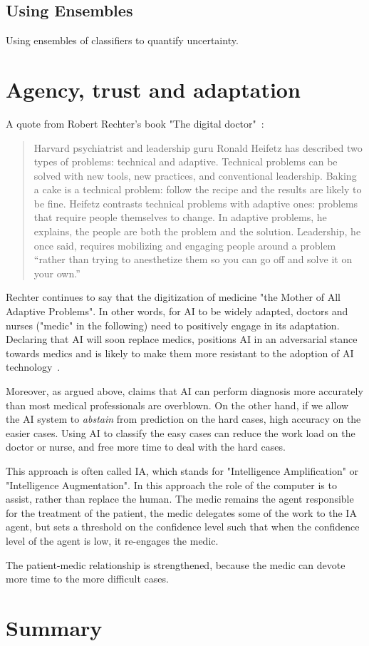 \documentclass[fleqn,10pt]{wlscirep}
\begin{document}
\subsection*{Using Ensembles}

Using ensembles of classifiers to quantify uncertainty.

\section{Agency, trust and adaptation}

A quote from Robert Rechter's book "The digital doctor"~\cite{wachter2015digital}:
\begin{quote}
    Harvard psychiatrist and leadership guru Ronald Heifetz has described two types of problems: technical and adaptive. Technical problems can be solved with new tools, new practices, and conventional leadership. Baking a cake is a technical problem: follow the recipe and the results are likely to be fine. Heifetz contrasts technical problems with adaptive ones: problems that require people themselves to change. In adaptive problems, he explains, the people
    are both the problem and the solution. Leadership, he once said, requires mobilizing and engaging people around a problem “rather than trying to anesthetize them so you can go off and solve it on your own.” 
\end{quote}

Rechter continues to say that the digitization of medicine "the Mother of All Adaptive Problems". In other words, for AI to be widely adapted, doctors and nurses ("medic" in the following) need to positively engage in its adaptation. Declaring that AI will soon replace medics, positions AI in an adversarial stance towards medics and is likely to make them more resistant to the adoption of AI technology~\cite{topol2019deep}.

Moreover, as argued above, claims that AI can perform diagnosis more accurately than most medical professionals are overblown. On the other hand, if we allow the AI system to {\em abstain} from prediction on the hard cases, high accuracy on the easier cases. Using AI to classify the easy cases can reduce the work load on the doctor or nurse, and free more time to deal with the hard cases.

This approach is often called IA, which stands for "Intelligence Amplification" or "Intelligence Augmentation". In this approach the role of the computer is to assist, rather than replace the human.  The medic remains the agent responsible for the treatment of the patient, the medic delegates some of the work to the IA agent, but sets a threshold on the confidence level such that when the confidence level of the agent is low, it re-engages the medic.

The patient-medic relationship is strengthened, because the medic can devote more time to the more difficult cases.

\section{Summary}

 


\end{document}
